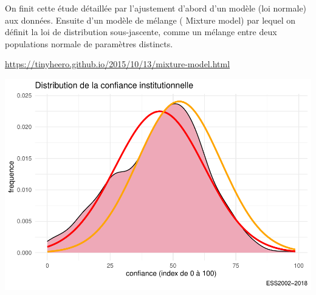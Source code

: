 \documentclass[
]{book}
\newenvironment{Shaded}{\begin{snugshade}}{\end{snugshade}}
\newcommand{\AttributeTok}[1]{\textcolor[rgb]{0.77,0.63,0.00}{#1}}
\newcommand{\CommentTok}[1]{\textcolor[rgb]{0.56,0.35,0.01}{\textit{#1}}}
\newcommand{\DecValTok}[1]{\textcolor[rgb]{0.00,0.00,0.81}{#1}}
\newcommand{\FloatTok}[1]{\textcolor[rgb]{0.00,0.00,0.81}{#1}}
\newcommand{\FunctionTok}[1]{\textcolor[rgb]{0.00,0.00,0.00}{#1}}
\newcommand{\NormalTok}[1]{#1}
\newcommand{\OtherTok}[1]{\textcolor[rgb]{0.56,0.35,0.01}{#1}}
\newcommand{\SpecialCharTok}[1]{\textcolor[rgb]{0.00,0.00,0.00}{#1}}
\newcommand{\StringTok}[1]{\textcolor[rgb]{0.31,0.60,0.02}{#1}}
\begin{document}
On finit cette étude détaillée par l'ajustement d'abord d'un modèle (loi normale) aux données. Ensuite d'un modèle de mélange ( Mixture model) par lequel on définit la loi de distribution sous-jascente, comme un mélange entre deux populations normale de paramètres distincts.

\url{https://tinyheero.github.io/2015/10/13/mixture-model.html}

\begin{Shaded}
\end{Shaded}

\includegraphics{bookdown-demo_files/figure-latex/307-1.pdf}
\end{document}
